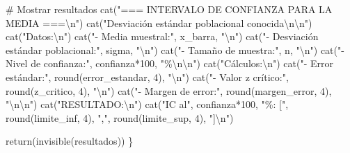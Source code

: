 \documentclass[
  spanish,
  letterpaper,
]{book}
\newenvironment{Shaded}{\begin{snugshade}}{\end{snugshade}}
\newcommand{\CommentTok}[1]{\textcolor[rgb]{0.37,0.37,0.37}{#1}}
\newcommand{\DecValTok}[1]{\textcolor[rgb]{0.68,0.00,0.00}{#1}}
\newcommand{\FunctionTok}[1]{\textcolor[rgb]{0.28,0.35,0.67}{#1}}
\newcommand{\NormalTok}[1]{\textcolor[rgb]{0.00,0.23,0.31}{#1}}
\newcommand{\SpecialCharTok}[1]{\textcolor[rgb]{0.37,0.37,0.37}{#1}}
\newcommand{\StringTok}[1]{\textcolor[rgb]{0.13,0.47,0.30}{#1}}
\begin{document}
\begin{Shaded}
\begin{Highlighting}[]
  \CommentTok{\# Mostrar resultados}
  \FunctionTok{cat}\NormalTok{(}\StringTok{"=== INTERVALO DE CONFIANZA PARA LA MEDIA ===}\SpecialCharTok{\textbackslash{}n}\StringTok{"}\NormalTok{)}
  \FunctionTok{cat}\NormalTok{(}\StringTok{"Desviación estándar poblacional conocida}\SpecialCharTok{\textbackslash{}n\textbackslash{}n}\StringTok{"}\NormalTok{)}
  \FunctionTok{cat}\NormalTok{(}\StringTok{"Datos:}\SpecialCharTok{\textbackslash{}n}\StringTok{"}\NormalTok{)}
  \FunctionTok{cat}\NormalTok{(}\StringTok{"{-} Media muestral:"}\NormalTok{, x\_barra, }\StringTok{"}\SpecialCharTok{\textbackslash{}n}\StringTok{"}\NormalTok{)}
  \FunctionTok{cat}\NormalTok{(}\StringTok{"{-} Desviación estándar poblacional:"}\NormalTok{, sigma, }\StringTok{"}\SpecialCharTok{\textbackslash{}n}\StringTok{"}\NormalTok{)}
  \FunctionTok{cat}\NormalTok{(}\StringTok{"{-} Tamaño de muestra:"}\NormalTok{, n, }\StringTok{"}\SpecialCharTok{\textbackslash{}n}\StringTok{"}\NormalTok{)}
  \FunctionTok{cat}\NormalTok{(}\StringTok{"{-} Nivel de confianza:"}\NormalTok{, confianza}\SpecialCharTok{*}\DecValTok{100}\NormalTok{, }\StringTok{"\%}\SpecialCharTok{\textbackslash{}n\textbackslash{}n}\StringTok{"}\NormalTok{)}
  \FunctionTok{cat}\NormalTok{(}\StringTok{"Cálculos:}\SpecialCharTok{\textbackslash{}n}\StringTok{"}\NormalTok{)}
  \FunctionTok{cat}\NormalTok{(}\StringTok{"{-} Error estándar:"}\NormalTok{, }\FunctionTok{round}\NormalTok{(error\_estandar, }\DecValTok{4}\NormalTok{), }\StringTok{"}\SpecialCharTok{\textbackslash{}n}\StringTok{"}\NormalTok{)}
  \FunctionTok{cat}\NormalTok{(}\StringTok{"{-} Valor z crítico:"}\NormalTok{, }\FunctionTok{round}\NormalTok{(z\_critico, }\DecValTok{4}\NormalTok{), }\StringTok{"}\SpecialCharTok{\textbackslash{}n}\StringTok{"}\NormalTok{)}
  \FunctionTok{cat}\NormalTok{(}\StringTok{"{-} Margen de error:"}\NormalTok{, }\FunctionTok{round}\NormalTok{(margen\_error, }\DecValTok{4}\NormalTok{), }\StringTok{"}\SpecialCharTok{\textbackslash{}n\textbackslash{}n}\StringTok{"}\NormalTok{)}
  \FunctionTok{cat}\NormalTok{(}\StringTok{"RESULTADO:}\SpecialCharTok{\textbackslash{}n}\StringTok{"}\NormalTok{)}
  \FunctionTok{cat}\NormalTok{(}\StringTok{"IC al"}\NormalTok{, confianza}\SpecialCharTok{*}\DecValTok{100}\NormalTok{, }\StringTok{"\%: ["}\NormalTok{, }\FunctionTok{round}\NormalTok{(limite\_inf, }\DecValTok{4}\NormalTok{), }
      \StringTok{","}\NormalTok{, }\FunctionTok{round}\NormalTok{(limite\_sup, }\DecValTok{4}\NormalTok{), }\StringTok{"]}\SpecialCharTok{\textbackslash{}n}\StringTok{"}\NormalTok{)}
  
  \FunctionTok{return}\NormalTok{(}\FunctionTok{invisible}\NormalTok{(resultados))}
\NormalTok{\}}
\end{Highlighting}
\end{Shaded}
\end{document}
